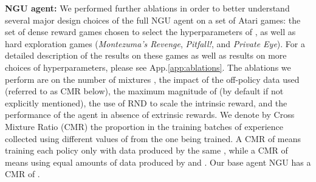 \documentclass{article} \usepackage{iclr2020_conference,times}
\begin{document}
{\bf NGU agent:} We performed further ablations in order to better understand several major design choices of the full NGU agent on a set of  Atari games: the set of  dense reward games chosen to select the hyperparameters of \citet{mnih2015human}, as well as  hard exploration games (\textit{Montezuma's Revenge}, \textit{Pitfall!}, and \textit{Private Eye}). For a detailed description of the results on these games as well as results on more choices of hyperparameters, please see App.\ref{app:ablations}.
The ablations we perform are on the number of mixtures , the impact of the off-policy data used (referred to as CMR below), the maximum magnitude of  (by default  if not explicitly mentioned), the use of RND to scale the intrinsic reward, and the performance of the agent in absence of extrinsic rewards. 
We denote by Cross Mixture Ratio (CMR) the proportion in the training batches of experience collected using different values of  from the one being trained. A CMR of  means training each policy only with data produced by the same , while a CMR of  means using equal amounts of data produced by  and . Our base agent NGU has a CMR of .
\end{document}
